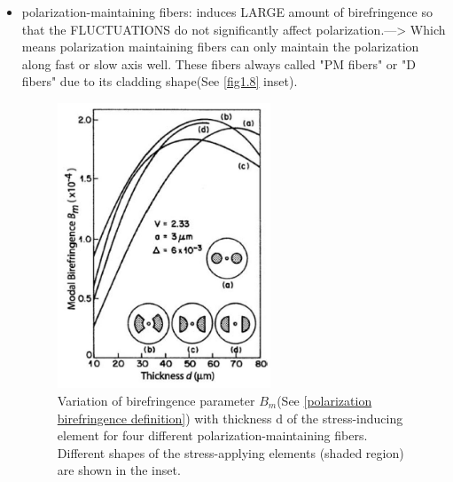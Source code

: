 \documentclass[12pt]{extarticle}
\numberwithin{equation}{section}
\numberwithin{figure}{section}
\numberwithin{table}{section}
\newcommand{\<}{\langle}
\renewcommand{\>}{\rangle}
\theoremstyle{definition}
\begin{document}
\begin{itemize}
                \item polarization-maintaining fibers: induces LARGE amount of birefringence so that the FLUCTUATIONS do not significantly affect polarization.---> Which means polarization maintaining fibers can only maintain the polarization along fast or slow axis well. These fibers always called "PM fibers" or "D fibers" due to its cladding shape(See \autoref{fig1.8} inset).
                    \begin{figure}[htbp]
                        \centering
                        \includegraphics[width=0.6\textwidth]{images/fig1.8.PNG}
                        \caption{Variation of birefringence parameter $B_m$(See \autoref{polarization birefringence definition}) with thickness d of the stress-inducing
                        element for four different polarization-maintaining fibers. Different shapes of the
                        stress-applying elements (shaded region) are shown in the inset.}
                        \label{fig1.8}
                    \end{figure}
            \end{itemize}
            
\end{document}
